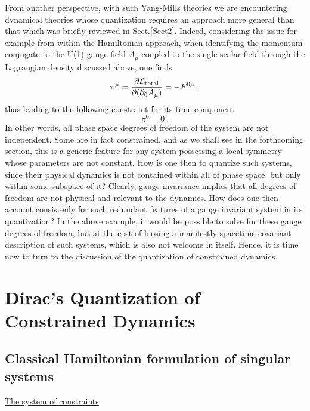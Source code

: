\documentclass[a4paper,11pt]{article}
\begin{document}
From another perspective, with such Yang-Mills theories we are encountering
dynamical theories whose quantization requires an approach more ge\-ne\-ral
than that which was briefly reviewed in Sect.\ref{Sect2}. Indeed,
considering the issue for example from within the Hamiltonian approach,
when identifying the momentum conjugate to the U(1) gauge field $A_\mu$
coupled to the single scalar field through the Lagrangian density discussed 
above, one finds
\begin{equation}
\pi^\mu=\frac{\partial{\cal L}_{\rm total}}{\partial(\partial_0A_\mu)}=
-F^{0\mu}\ ,
\end{equation}
thus leading to the following constraint for its time component
\begin{equation}
\pi^0=0\ .
\end{equation}
In other words, all phase space degrees of freedom of the system are
not independent. Some are in fact constrained, and as we
shall see in the forthcoming section, this is a generic feature for
any system possessing a local symmetry whose parameters are not constant.
How is one then to quantize such systems, since their physical dynamics
is not contained within all of phase space, but only within some subspace
of it? Clearly, gauge invariance implies that all degrees of freedom are
not physical and relevant to the dynamics. How does one then account
consistenly for such redundant features of a gauge invariant system
in its quantization? In the above example, it would be possible to
solve for these gauge degrees of freedom, but at the cost of loosing
a manifestly spacetime covariant description of such systems, which is
also not welcome in itself. Hence, it is time now to turn to the
discussion of the quantization of constrained dynamics.


\section{Dirac's Quantization of Constrained Dynamics}
\label{Sect5}

\subsection{Classical Hamiltonian formulation of singular systems}
\label{Subsect5.1}

\noindent\underline{The system of constraints}

\vspace{5pt}
\end{document}
